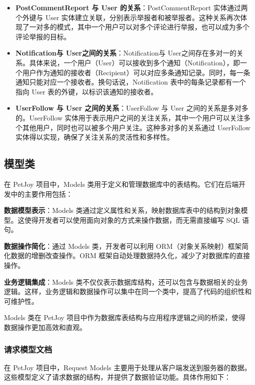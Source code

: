 \begin{itemize}
\begin{itemize}
		\item \textbf{PostCommentReport 与 User 的关系}：PostCommentReport 实体通过两个外键与 User 实体建立关联，分别表示举报者和被举报者。这种关系再次体现了一对多的模式，其中一个用户可以对多个评论进行举报，也可以成为多个评论举报的目标。
		
		\item \textbf{Notification与 User之间的关系}：Notification与 User之间存在多对一的关系。具体来说，一个用户（User）可以接收到多个通知（Notification），即一个用户作为通知的接收者（Recipient）可以对应多条通知记录。同时，每一条通知只能对应一个接收者。换句话说，Notification 表中的每条记录都有一个指向 User 表的外键，以标识该通知的接收者。
		
		\item \textbf{UserFollow 与 User 之间的关系}：UserFollow 与 User 之间的关系是多对多的。UserFollow 实体用于表示用户之间的关注关系，其中一个用户可以关注多个其他用户，同时也可以被多个用户关注。这种多对多的关系通过 UserFollow 实体得以实现，确保了关注关系的灵活性和多样性。
	\end{itemize}
\end{itemize}

\subsection{模型类}
在 PetJoy 项目中，Models 类用于定义和管理数据库中的表结构。它们在后端开发中的主要作用包括：


\textbf{数据模型表示}：Models 类通过定义属性和关系，映射数据库表中的结构到对象模型。这使得开发者可以使用面向对象的方式来操作数据，而无需直接编写 SQL 语句。

\textbf{数据操作简化}：通过 Models 类，开发者可以利用 ORM（对象关系映射）框架简化数据的增删改查操作。ORM 框架自动处理数据持久化，减少了对数据库的直接操作。

\textbf{业务逻辑集成}：Models 类不仅仅表示数据库结构，还可以包含与数据相关的业务逻辑。这样，业务逻辑和数据操作可以集中在同一个类中，提高了代码的组织性和可维护性。


Models 类在 PetJoy 项目中作为数据库表结构与应用程序逻辑之间的桥梁，使得数据操作更加高效和直观。

\subsubsection{请求模型文档}

在 PetJoy 项目中，Request Models 主要用于处理从客户端发送到服务器的数据。这些模型定义了请求数据的结构，并提供了数据验证功能。具体作用如下：


